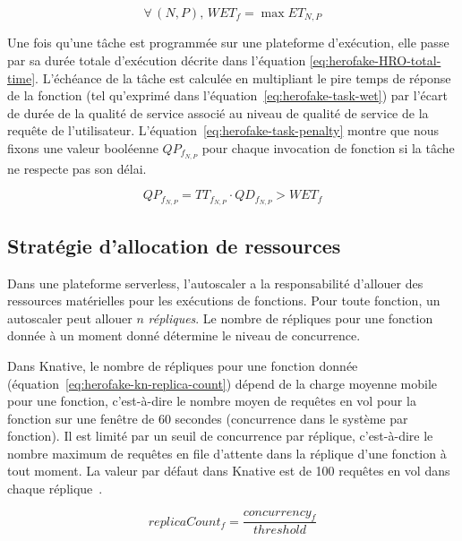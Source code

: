 \begin{equation}
    \forall \, (N, P), \, WET_{f} = \max ET_{N, P}
\label{eq:herofake-task-wet}
\end{equation}

Une fois qu'une tâche est programmée sur une plateforme d'exécution, elle passe par sa durée totale d'exécution décrite dans l'équation \ref{eq:herofake-HRO-total-time}. L'échéance de la tâche est calculée en multipliant le pire temps de réponse de la fonction (tel qu'exprimé dans l'équation~\ref{eq:herofake-task-wet}) par l'écart de durée de la qualité de service associé au niveau de qualité de service de la requête de l'utilisateur. L'équation~\ref{eq:herofake-task-penalty} montre que nous fixons une valeur booléenne $QP_{f_{N, P}}$ pour chaque invocation de fonction si la tâche ne respecte pas son délai. 


\begin{equation}
    QP_{f_{N, P}} = TT_{f_{N, P}} \cdot QD_{f_{N, P}} > WET_{f}
\label{eq:herofake-task-penalty}
\end{equation}

\subsection{Stratégie d'allocation de ressources} \label{section:herofake-autoscaling-strategy}

Dans une plateforme serverless, l'autoscaler a la responsabilité d'allouer des ressources matérielles pour les exécutions de fonctions. Pour toute fonction, un autoscaler peut allouer $n$ \textit{répliques}. Le nombre de répliques pour une fonction donnée à un moment donné détermine le niveau de concurrence.

Dans Knative, le nombre de répliques pour une fonction donnée (équation~\ref{eq:herofake-kn-replica-count}) dépend de la charge moyenne mobile pour une fonction, c'est-à-dire le nombre moyen de requêtes en vol pour la fonction sur une fenêtre de 60 secondes (concurrence dans le système par fonction). Il est limité par un seuil de concurrence par réplique, c'est-à-dire le nombre maximum de requêtes en file d'attente dans la réplique d'une fonction à tout moment. La valeur par défaut dans Knative est de 100 requêtes en vol dans chaque réplique~\cite{knative-autoscaling}.

\begin{equation}
    replicaCount_{f} = \frac{concurrency_{f}}{threshold}
\label{eq:herofake-kn-replica-count}
\end{equation}

